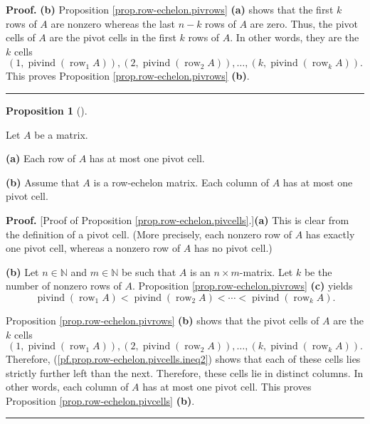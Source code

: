 \documentclass[numbers=enddot,12pt,final,onecolumn,notitlepage]{scrartcl}%
\theoremstyle{definition}
\newtheorem{prop}[theo]{Proposition}
\newenvironment{proposition}[1][]
{\begin{prop}[#1]\begin{leftbar}}
{\end{leftbar}\end{prop}}
\newenvironment{proof}[1][Proof]{\noindent\textbf{#1.} }{\ \rule{0.5em}{0.5em}}
\begin{document}
\begin{proof}
\textbf{(b)} Proposition \ref{prop.row-echelon.pivrows} \textbf{(a)} shows
that the first $k$ rows of $A$ are nonzero whereas the last $n-k$ rows of $A$
are zero. Thus, the pivot cells of $A$ are the pivot cells in the first $k$
rows of $A$. In other words, they are the $k$ cells
\[
\left(  1,\operatorname*{pivind}\left(  \operatorname*{row}\nolimits_{1}%
A\right)  \right)  ,\left(  2,\operatorname*{pivind}\left(
\operatorname*{row}\nolimits_{2}A\right)  \right)  ,\ldots,\left(
k,\operatorname*{pivind}\left(  \operatorname*{row}\nolimits_{k}A\right)
\right)  .
\]
This proves Proposition \ref{prop.row-echelon.pivrows} \textbf{(b)}.
\end{proof}

\begin{proposition}
\label{prop.row-echelon.pivcells}Let $A$ be a matrix.

\textbf{(a)} Each row of $A$ has at most one pivot cell.

\textbf{(b)} Assume that $A$ is a row-echelon matrix. Each column of $A$ has
at most one pivot cell.
\end{proposition}

\begin{proof}
[Proof of Proposition \ref{prop.row-echelon.pivcells}.]\textbf{(a)} This is
clear from the definition of a pivot cell. (More precisely, each nonzero row
of $A$ has exactly one pivot cell, whereas a nonzero row of $A$ has no pivot cell.)

\textbf{(b)} Let $n\in\mathbb{N}$ and $m\in\mathbb{N}$ be such that $A$ is an
$n\times m$-matrix. Let $k$ be the number of nonzero rows of $A$. Proposition
\ref{prop.row-echelon.pivrows} \textbf{(c)} yields%
\begin{equation}
\operatorname*{pivind}\left(  \operatorname*{row}\nolimits_{1}A\right)
<\operatorname*{pivind}\left(  \operatorname*{row}\nolimits_{2}A\right)
<\cdots<\operatorname*{pivind}\left(  \operatorname*{row}\nolimits_{k}%
A\right)  . \label{pf.prop.row-echelon.pivcells.ineq2}%
\end{equation}


Proposition \ref{prop.row-echelon.pivrows} \textbf{(b)} shows that the pivot
cells of $A$ are the $k$ cells
\[
\left(  1,\operatorname*{pivind}\left(  \operatorname*{row}\nolimits_{1}%
A\right)  \right)  ,\left(  2,\operatorname*{pivind}\left(
\operatorname*{row}\nolimits_{2}A\right)  \right)  ,\ldots,\left(
k,\operatorname*{pivind}\left(  \operatorname*{row}\nolimits_{k}A\right)
\right)  .
\]
Therefore, (\ref{pf.prop.row-echelon.pivcells.ineq2}) shows that each of these
cells lies strictly further left than the next. Therefore, these cells lie in
distinct columns. In other words, each column of $A$ has at most one pivot
cell. This proves Proposition \ref{prop.row-echelon.pivcells} \textbf{(b)}.
\end{proof}
\end{document}
